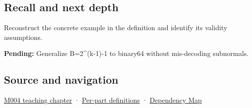 \subsection{Recall and next depth}\label{appendix-2fae058c82e1-recall-and-next-depth}

Reconstruct the concrete example in the definition and identify its validity assumptions.

\textbf{Pending:} Generalize B=2\^{}(k-1)-1 to binary64 without mis-decoding subnormals.

\subsection{Source and navigation}\label{appendix-2fae058c82e1-source-and-navigation}

\hyperref[01-foundations-i-ch001-a-stretching-ruler-for-real-valued-quantities]{M004 teaching chapter} · \hyperref[appendix-fd090d982a15-m004---parts-61-76]{Per-part definitions} · \hyperref[appendix-4ad47bdd269a]{Dependency Map}
